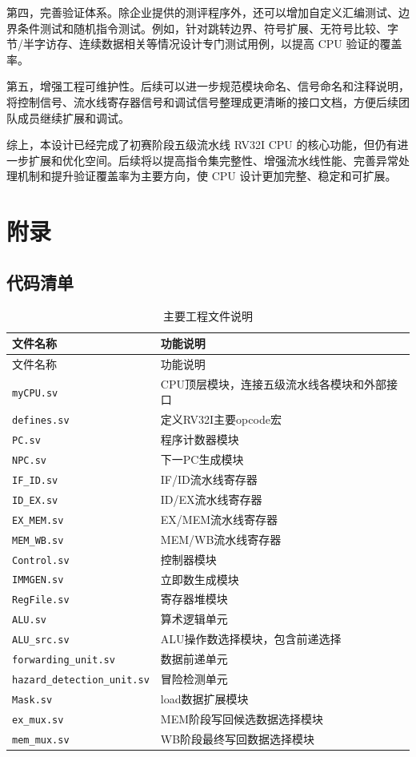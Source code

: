 \documentclass[UTF8,a4paper,12pt]{ctexart}
\newcommand{\code}[1]{\texttt{#1}}
\begin{document}
第四，完善验证体系。除企业提供的测评程序外，还可以增加自定义汇编测试、边界条件测试和随机指令测试。例如，针对跳转边界、符号扩展、无符号比较、字节/半字访存、连续数据相关等情况设计专门测试用例，以提高 CPU 验证的覆盖率。

第五，增强工程可维护性。后续可以进一步规范模块命名、信号命名和注释说明，将控制信号、流水线寄存器信号和调试信号整理成更清晰的接口文档，方便后续团队成员继续扩展和调试。

综上，本设计已经完成了初赛阶段五级流水线 RV32I CPU 的核心功能，但仍有进一步扩展和优化空间。后续将以提高指令集完整性、增强流水线性能、完善异常处理机制和提升验证覆盖率为主要方向，使 CPU 设计更加完整、稳定和可扩展。

\section{附录}

\subsection{代码清单}

\begin{longtable}{p{5cm}p{9cm}}
\caption{主要工程文件说明}\\
\toprule
文件名称 & 功能说明 \\
\midrule
\endfirsthead
\toprule
文件名称 & 功能说明 \\
\midrule
\endhead
\code{myCPU.sv} & CPU顶层模块，连接五级流水线各模块和外部接口 \\
\code{defines.sv} & 定义RV32I主要opcode宏 \\
\code{PC.sv} & 程序计数器模块 \\
\code{NPC.sv} & 下一PC生成模块 \\
\code{IF\_ID.sv} & IF/ID流水线寄存器 \\
\code{ID\_EX.sv} & ID/EX流水线寄存器 \\
\code{EX\_MEM.sv} & EX/MEM流水线寄存器 \\
\code{MEM\_WB.sv} & MEM/WB流水线寄存器 \\
\code{Control.sv} & 控制器模块 \\
\code{IMMGEN.sv} & 立即数生成模块 \\
\code{RegFile.sv} & 寄存器堆模块 \\
\code{ALU.sv} & 算术逻辑单元 \\
\code{ALU\_src.sv} & ALU操作数选择模块，包含前递选择 \\
\code{forwarding\_unit.sv} & 数据前递单元 \\
\code{hazard\_detection\_unit.sv} & 冒险检测单元 \\
\code{Mask.sv} & load数据扩展模块 \\
\code{ex\_mux.sv} & MEM阶段写回候选数据选择模块 \\
\code{mem\_mux.sv} & WB阶段最终写回数据选择模块 \\
\bottomrule
\end{longtable}
\end{document}
